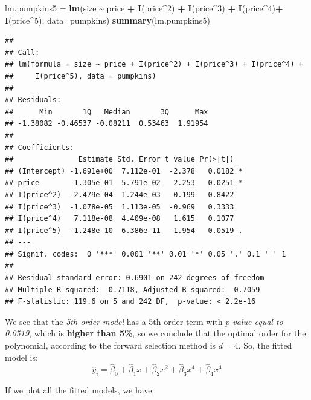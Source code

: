 \documentclass[
]{book}
\newenvironment{Shaded}{\begin{snugshade}}{\end{snugshade}}
\newcommand{\AttributeTok}[1]{\textcolor[rgb]{0.13,0.29,0.53}{#1}}
\newcommand{\DecValTok}[1]{\textcolor[rgb]{0.00,0.00,0.81}{#1}}
\newcommand{\FunctionTok}[1]{\textcolor[rgb]{0.13,0.29,0.53}{\textbf{#1}}}
\newcommand{\NormalTok}[1]{#1}
\newcommand{\OtherTok}[1]{\textcolor[rgb]{0.56,0.35,0.01}{#1}}
\newcommand{\SpecialCharTok}[1]{\textcolor[rgb]{0.81,0.36,0.00}{\textbf{#1}}}
\begin{document}
\begin{Shaded}
\begin{Highlighting}[]
\NormalTok{lm.pumpkins5 }\OtherTok{=}  \FunctionTok{lm}\NormalTok{(size }\SpecialCharTok{\textasciitilde{}}\NormalTok{ price }\SpecialCharTok{+} \FunctionTok{I}\NormalTok{(price}\SpecialCharTok{\^{}}\DecValTok{2}\NormalTok{) }\SpecialCharTok{+} \FunctionTok{I}\NormalTok{(price}\SpecialCharTok{\^{}}\DecValTok{3}\NormalTok{) }\SpecialCharTok{+} \FunctionTok{I}\NormalTok{(price}\SpecialCharTok{\^{}}\DecValTok{4}\NormalTok{)}\SpecialCharTok{+} \FunctionTok{I}\NormalTok{(price}\SpecialCharTok{\^{}}\DecValTok{5}\NormalTok{), }\AttributeTok{data=}\NormalTok{pumpkins)}
\FunctionTok{summary}\NormalTok{(lm.pumpkins5)}
\end{Highlighting}
\end{Shaded}

\begin{verbatim}
## 
## Call:
## lm(formula = size ~ price + I(price^2) + I(price^3) + I(price^4) + 
##     I(price^5), data = pumpkins)
## 
## Residuals:
##      Min       1Q   Median       3Q      Max 
## -1.38082 -0.46537 -0.08211  0.53463  1.91954 
## 
## Coefficients:
##               Estimate Std. Error t value Pr(>|t|)  
## (Intercept) -1.691e+00  7.112e-01  -2.378   0.0182 *
## price        1.305e-01  5.791e-02   2.253   0.0251 *
## I(price^2)  -2.479e-04  1.244e-03  -0.199   0.8422  
## I(price^3)  -1.078e-05  1.113e-05  -0.969   0.3333  
## I(price^4)   7.118e-08  4.409e-08   1.615   0.1077  
## I(price^5)  -1.248e-10  6.386e-11  -1.954   0.0519 .
## ---
## Signif. codes:  0 '***' 0.001 '**' 0.01 '*' 0.05 '.' 0.1 ' ' 1
## 
## Residual standard error: 0.6901 on 242 degrees of freedom
## Multiple R-squared:  0.7118, Adjusted R-squared:  0.7059 
## F-statistic: 119.6 on 5 and 242 DF,  p-value: < 2.2e-16
\end{verbatim}

We see that the \emph{5th order model} has a 5th order term with \emph{\(p\)-value equal to 0.0519}, which is \textbf{higher than 5\%}, so we conclude that the optimal order for the polynomial, according to the forward selection method is \(d=4\). So, the fitted model is:
\[\hat{y}_i = \hat{\beta}_0 + \hat{\beta}_1 x + \hat{\beta}_2 x^2 + \hat{\beta}_3 x^4 + \hat{\beta}_4 x^4 \]

If we plot all the fitted models, we have:
\end{document}
